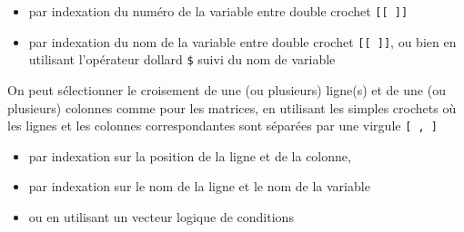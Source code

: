 \documentclass[
]{book}
\newenvironment{Shaded}{\begin{snugshade}}{\end{snugshade}}
\newcommand{\CommentTok}[1]{\textcolor[rgb]{0.56,0.35,0.01}{\textit{#1}}}
\newcommand{\DecValTok}[1]{\textcolor[rgb]{0.00,0.00,0.81}{#1}}
\newcommand{\DocumentationTok}[1]{\textcolor[rgb]{0.56,0.35,0.01}{\textbf{\textit{#1}}}}
\newcommand{\NormalTok}[1]{#1}
\newcommand{\SpecialCharTok}[1]{\textcolor[rgb]{0.81,0.36,0.00}{\textbf{#1}}}
\newcommand{\StringTok}[1]{\textcolor[rgb]{0.31,0.60,0.02}{#1}}
\providecommand{\tightlist}{%
  \setlength{\itemsep}{0pt}\setlength{\parskip}{0pt}}
\begin{document}
\begin{itemize}
\tightlist
\item
  par indexation du numéro de la variable entre double crochet \texttt{{[}{[}\ {]}{]}}
\item
  par indexation du nom de la variable entre double crochet \texttt{{[}{[}\ {]}{]}}, ou bien en utilisant l'opérateur dollard \texttt{\$} suivi du nom de variable
\end{itemize}

\begin{Shaded}
\end{Shaded}

On peut sélectionner le croisement de une (ou plusieurs) ligne(s) et de une (ou plusieurs) colonnes comme pour les matrices, en utilisant les simples crochets où les lignes et les colonnes correspondantes sont séparées par une virgule \texttt{{[}\ ,\ {]}}

\begin{itemize}
\tightlist
\item
  par indexation sur la position de la ligne et de la colonne,
\item
  par indexation sur le nom de la ligne et le nom de la variable
\item
  ou en utilisant un vecteur logique de conditions
\end{itemize}
\end{document}
